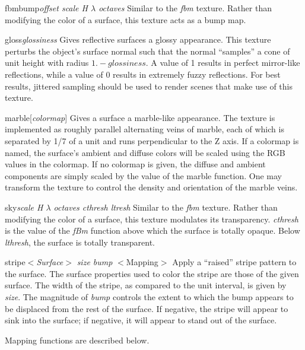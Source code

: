 \begin{defkey}{fbmbump}{{\em offset scale H $\lambda$ octaves}}
Similar to the {\em fbm} texture.  Rather than modifying the color of
a surface, this texture acts as a bump map.
\end{defkey}

\begin{defkey}{gloss}{{\em glossiness}}
Gives reflective surfaces a glossy appearance. This texture perturbs
the object's surface normal such that the normal ``samples'' a cone of
unit height with radius $1. - glossiness$.  A value of 1 results
in perfect mirror-like reflections, while a value of 0 results
in extremely fuzzy reflections.  For best results, jittered sampling
should be used to render scenes that make use of this texture.
\end{defkey}

\begin{defkey}{marble}{[{\em colormap}]}
Gives a surface a marble-like appearance.  The texture is implemented as
roughly parallel alternating veins of marble, each of which is
separated by 1/7 of a unit and runs perpendicular to the Z axis.
If a colormap is named, the surface's ambient and diffuse colors
will be scaled using the RGB values in the colormap.  If no colormap is
given, the diffuse and ambient components are simply scaled by the
value of the marble function.  One may transform the texture to
control the density and orientation of the marble veins.
\end{defkey}

\begin{defkey}{sky}{{\em scale H $\lambda$ octaves cthresh ltresh}}
	Similar to the {\em fbm} texture.  Rather than modifying the
	color of a surface, this texture modulates its transparency.
	{\em cthresh} is the value of the {\em fBm} function above
	which the surface is totally opaque.  Below {\em lthresh},
	the surface is totally transparent.
\end{defkey}

\begin{defkey}{stripe}{$<${\em Surface}$>$ {\em size bump} $<$Mapping$>$}
	Apply a ``raised'' stripe pattern to the surface.
	The surface properties used to color the stripe are those
	of the given surface.  The width of the stripe, as compared
	to the unit interval, is given by {\em size}.  The magnitude
	of {\em bump} controls the extent to which the bump appears
	to be displaced from the rest of the surface.  If negative,
	the stripe will appear to
	sink into the surface; if negative, it will appear to stand
	out of the surface.
\end{defkey}
Mapping functions are described below.

